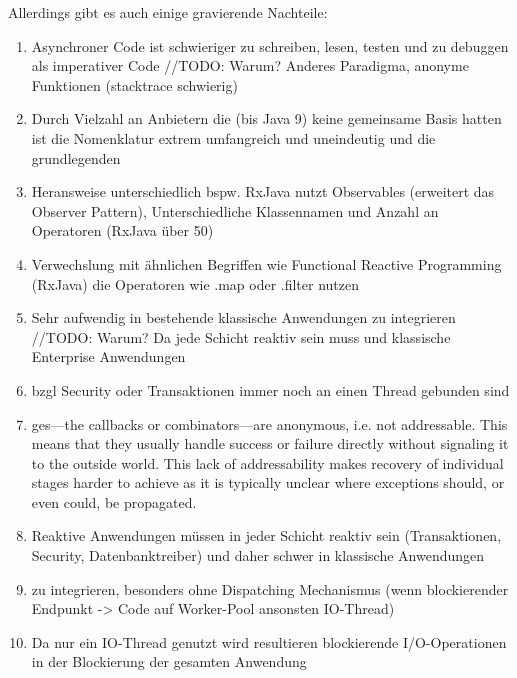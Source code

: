 Allerdings gibt es auch einige gravierende Nachteile:

\begin{enumerate}
	\item Asynchroner Code ist schwieriger zu schreiben, lesen, testen und zu debuggen als imperativer Code
	      //TODO:  Warum? Anderes Paradigma, anonyme Funktionen (stacktrace schwierig)
	\item Durch Vielzahl an Anbietern die (bis Java 9) keine gemeinsame Basis hatten ist die Nomenklatur extrem umfangreich und uneindeutig und die grundlegenden
	\item Heransweise unterschiedlich bspw. RxJava nutzt Observables (erweitert das Observer Pattern), Unterschiedliche Klassennamen und
	      Anzahl an Operatoren (RxJava über 50)
	\item Verwechslung mit ähnlichen Begriffen wie Functional Reactive Programming (RxJava) die Operatoren wie .map oder .filter nutzen

	\item Sehr aufwendig in bestehende klassische Anwendungen zu integrieren //TODO:  Warum? Da jede Schicht reaktiv sein muss
	      und klassische Enterprise Anwendungen
	\item bzgl Security oder Transaktionen immer noch an einen Thread gebunden sind
	\item ges—the callbacks or combinators—are anonymous, i.e. not addressable.
	      This means that they usually handle success or failure directly without signaling it to the outside world. This lack of addressability makes recovery
	      of individual stages harder to achieve as it is typically unclear where exceptions should, or even could, be propagated.
	\item Reaktive Anwendungen müssen in jeder Schicht reaktiv sein (Transaktionen, Security, Datenbanktreiber) und daher schwer in klassische Anwendungen
	\item zu integrieren, besonders ohne Dispatching Mechanismus (wenn blockierender Endpunkt -> Code auf Worker-Pool ansonsten IO-Thread)
	\item Da nur ein IO-Thread genutzt wird resultieren blockierende I/O-Operationen in der Blockierung der gesamten Anwendung
\end{enumerate}


